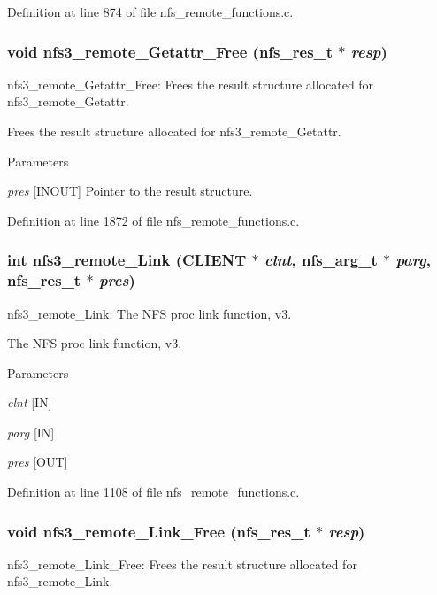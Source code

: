 Definition at line 874 of file nfs\_\-remote\_\-functions.c.
\subsubsection[{nfs3\_\-remote\_\-Getattr\_\-Free}]{\setlength{\rightskip}{0pt plus 5cm}void nfs3\_\-remote\_\-Getattr\_\-Free (nfs\_\-res\_\-t $\ast$ {\em resp})}\label{group__NFSprocs_ga026961cae408df543c535e171e8eb7f7}
nfs3\_\-remote\_\-Getattr\_\-Free: Frees the result structure allocated for nfs3\_\-remote\_\-Getattr.

Frees the result structure allocated for nfs3\_\-remote\_\-Getattr.


\begin{DoxyParams}{Parameters}
\item[{\em pres}][INOUT] Pointer to the result structure. \end{DoxyParams}


Definition at line 1872 of file nfs\_\-remote\_\-functions.c.
\subsubsection[{nfs3\_\-remote\_\-Link}]{\setlength{\rightskip}{0pt plus 5cm}int nfs3\_\-remote\_\-Link (CLIENT $\ast$ {\em clnt}, \/  nfs\_\-arg\_\-t $\ast$ {\em parg}, \/  nfs\_\-res\_\-t $\ast$ {\em pres})}\label{group__NFSprocs_ga8affac0a742b70688e87a63e3e6994f9}
nfs3\_\-remote\_\-Link: The NFS proc link function, v3.

The NFS proc link function, v3.


\begin{DoxyParams}{Parameters}
\item[{\em clnt}][IN] \item[{\em parg}][IN] \item[{\em pres}][OUT] \end{DoxyParams}


Definition at line 1108 of file nfs\_\-remote\_\-functions.c.
\subsubsection[{nfs3\_\-remote\_\-Link\_\-Free}]{\setlength{\rightskip}{0pt plus 5cm}void nfs3\_\-remote\_\-Link\_\-Free (nfs\_\-res\_\-t $\ast$ {\em resp})}\label{group__NFSprocs_ga7f9af32a3f7e4a479125890042d3455d}
nfs3\_\-remote\_\-Link\_\-Free: Frees the result structure allocated for nfs3\_\-remote\_\-Link.

